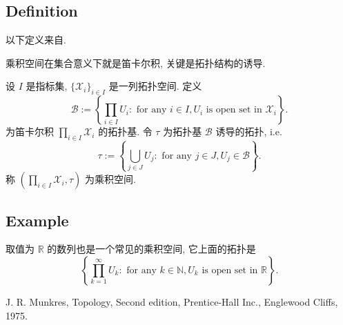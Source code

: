 \documentclass[a4paper,11pt]{article}
\theoremstyle{definition}
\begin{document}
\begin{CJK*}{UTF8}{gbsn}
\subsection{Definition}

以下定义来自\cite[p.114]{m75}.

乘积空间在集合意义下就是笛卡尔积, 关键是拓扑结构的诱导.

设 $ I $ 是指标集, $ \{\mathcal{X}_i\}_{i \in I} $ 是一列拓扑空间.
定义
$$
    \mathcal{B}
        := \left\{ \prod_{i \in I} U_i
            : \text{ for any } i \in I, U_i \text{ is open set in } \mathcal{X}_i \right\}.
$$
为笛卡尔积 $ \prod_{i \in I} \mathcal{X}_i $ 的拓扑基. 令 $ \tau $ 为拓扑基 $ \mathcal{B} $ 诱导的拓扑, i.e.
$$
    \tau := \left\{ \bigcup_{j \in J} U_j
        : \text{ for any } j \in J, U_j \in \mathcal{B} \right\}.
$$
称 $ (\prod_{i \in I} \mathcal{X}_i, \tau) $ 为乘积空间.

\subsection{Example}

取值为 $ \mathbb{R} $ 的数列也是一个常见的乘积空间, 它上面的拓扑是
$$
    \left\{\prod_{k = 1}^\infty U_k 
        : \text{ for any } k \in \mathbb{N}, U_k \text{ is open set in } \mathbb{R} \right\}.
$$


\begin{thebibliography}{99}
     J. R. Munkres, Topology, Second edition, 
    Prentice-Hall Inc., Englewood Cliffs, 1975.
    
\end{thebibliography}

\end{CJK*}
\end{document}

